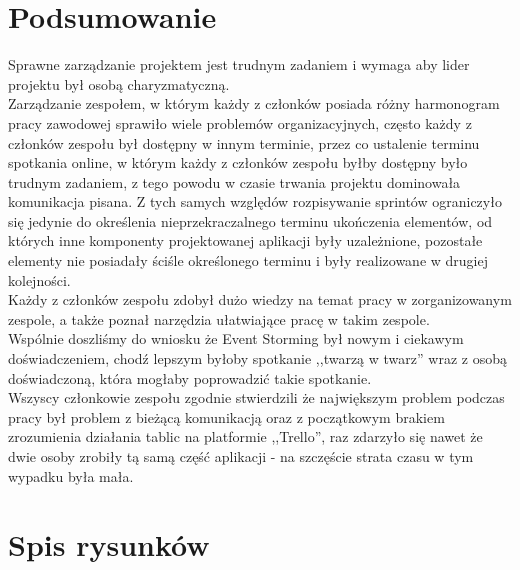 \documentclass[12pt,a4paper]{article}
\begin{document}
	\newpage	
	
	\section{Podsumowanie}
		\indent Sprawne zarządzanie projektem jest trudnym zadaniem i wymaga aby lider projektu był osobą charyzmatyczną.\\
		\indent Zarządzanie zespołem, w którym każdy z członków
		posiada różny harmonogram pracy zawodowej sprawiło wiele problemów organizacyjnych, często każdy z członków zespołu był dostępny w innym terminie,
		przez co ustalenie terminu spotkania online, w którym każdy z członków zespołu byłby dostępny było trudnym zadaniem, z tego powodu w czasie trwania projektu dominowała
		komunikacja pisana. Z tych samych względów rozpisywanie sprintów ograniczyło się jedynie do określenia nieprzekraczalnego terminu ukończenia elementów, od których inne
		komponenty projektowanej aplikacji były uzależnione, pozostałe elementy nie posiadały ściśle określonego terminu i były realizowane w drugiej kolejności.\\
		\indent Każdy z członków zespołu zdobył dużo wiedzy na temat pracy w zorganizowanym zespole, a także poznał narzędzia ułatwiające pracę w takim zespole.\\
		\indent Wspólnie doszliśmy do wniosku że Event Storming był nowym i  ciekawym doświadczeniem, chodź lepszym byłoby spotkanie ,,twarzą w twarz''
		wraz z osobą doświadczoną, która mogłaby poprowadzić takie spotkanie.\\
		\indent Wszyscy członkowie zespołu zgodnie stwierdzili że największym problem podczas pracy był problem z bieżącą komunikacją oraz z początkowym brakiem zrozumienia działania
		tablic na platformie ,,Trello'', raz zdarzyło się nawet	że dwie osoby zrobiły tą samą część aplikacji - na szczęście strata czasu w tym wypadku była mała.
	
	\newpage	
	\section{Spis rysunków}
		\listoffigures
\end{document}
